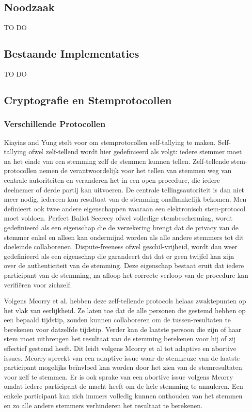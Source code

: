 	\subsection{Noodzaak}
			TO DO
	\subsection{Bestaande Implementaties}
			TO DO
	\subsection{Cryptografie en Stemprotocollen}
		\subsubsection{Verschillende Protocollen}
		Kiayias and Yung stelt voor om stemprotocollen self-tallying te maken. Self-tallying ofwel zelf-tellend wordt hier gedefinieerd als volgt: iedere stemmer moet na het einde van een stemming zelf de stemmen kunnen tellen. Zelf-tellende stem-protocollen nemen de verantwoordelijk voor het tellen van stemmen weg van centrale autoriteiten en veranderen het in een open procedure, die iedere deelnemer of derde partij kan uitvoeren. De centrale tellingsautoriteit is dan niet meer nodig, iedereen kan resultaat van de stemming onafhankelijk bekomen. Men definieert ook twee andere eigenschappen waaraan een elektronisch stem-protocol moet voldoen.  Perfect Ballot Secrecy ofwel volledige stembescherming, wordt gedefinieerd als een eigenschap die de verzekering brengt dat de privacy van de stemmer enkel en alleen kan ondermijnd worden als alle andere stemmers tot dit doeleinde collaborenen. Dispute-freeness ofwel geschil-vrijheid, wordt dan weer gedefinieerd als een eigenschap die garandeert dat dat er geen twijfel kan zijn over de authenticiteit van de stemming. Deze eigenschap bestaat eruit dat iedere participant van de stemming, na afloop het correcte verloop van de procedure kan verifiëren voor zichzelf.
			
		Volgens Mcorry et al.  hebben deze zelf-tellende protocols helaas zwaktepunten op het vlak van eerlijkheid. Ze laten toe dat de alle personen die gestemd hebben op een bepaald tijdstip, zouden kunnen collaboreren om de tussen-resultaten te berekenen voor datzelfde tijdstip. Verder kan de laatste persoon die zijn of haar stem moet uitbrengen het resultaat van de stemming berekenen voor hij of zij effectief gestemd heeft. Dit leidt volgens Mcorry et al tot adaptive en abortive issues.  Mcorry spreekt van een adaptive issue waar de stemkeuze van de laatste participant mogelijks beïnvloed kan worden door het zien van de stemresultaten voor zelf te stemmen. Er is ook sprake van een abortive issue volgens Mcorry omdat iedere participant de macht heeft om de hele stemming te annuleren. Een enkele participant kan zich immers volledig kunnen onthouden van het stemmen en zo alle andere stemmers verhinderen het resultaat te berekenen. 
			
